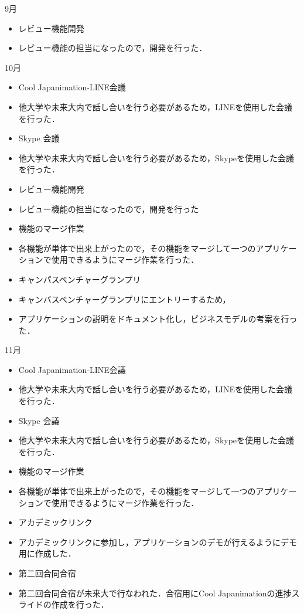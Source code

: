 9月
\begin{itemize}
\item レビュー機能開発
\item レビュー機能の担当になったので，開発を行った．
\end{itemize}
10月
\begin{itemize}
\item Cool Japanimation-LINE会議
\item   他大学や未来大内で話し合いを行う必要があるため，LINEを使用した会議を行った．
\item Skype 会議
\item 他大学や未来大内で話し合いを行う必要があるため，Skypeを使用した会議を行った．
\item レビュー機能開発
\item   レビュー機能の担当になったので，開発を行った
\item 機能のマージ作業
\item   各機能が単体で出来上がったので，その機能をマージして一つのアプリケーションで使用できるようにマージ作業を行った．
\item キャンパスベンチャーグランプリ
\item   キャンバスベンチャーグランプリにエントリーするため，
\item   アプリケーションの説明をドキュメント化し，ビジネスモデルの考案を行った．
\end{itemize}
11月
\begin{itemize}
\item Cool Japanimation-LINE会議
\item 他大学や未来大内で話し合いを行う必要があるため，LINEを使用した会議を行った．
\item Skype 会議
\item  他大学や未来大内で話し合いを行う必要があるため，Skypeを使用した会議を行った．
\item 機能のマージ作業
\item   各機能が単体で出来上がったので，その機能をマージして一つのアプリケーションで使用できるようにマージ作業を行った．
\item アカデミックリンク
\item アカデミックリンクに参加し，アプリケーションのデモが行えるようにデモ用に作成した．
\item 第二回合同合宿
\item   第二回合同合宿が未来大で行なわれた．合宿用にCool Japanimationの進捗スライドの作成を行った．
\end{itemize}

